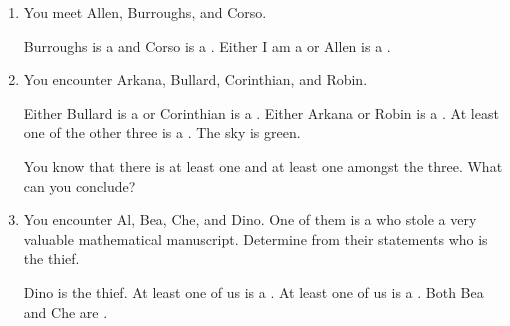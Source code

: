 \probsec{~\ref{sec:conjunctions}}
\begin{enumerate}
    \item You meet Allen, Burroughs, and Corso.
  \begin{dialogue}
     Burroughs is a \knave and Corso is a \knight.
     Either I am a \knave or Allen is a \knave.
  \end{dialogue}


  \item You encounter Arkana, Bullard, Corinthian, and Robin.
  \begin{dialogue}
     Either Bullard is a \knight or Corinthian is a \knave.
     Either Arkana or Robin is a \knave.
     At least one of the other three is a \knave.
     The sky is green.
  \end{dialogue}
  You know that there is at least one \knight and at least one \knave amongst the three. What can you conclude?

  \item You encounter Al, Bea, Che, and Dino. One of them is a \knave who stole a very valuable mathematical manuscript. Determine from their statements who is the thief.
  \begin{dialogue}
     Dino is the thief.
     At least one of us is a \knight.
     At least one of us is a \knave.
     Both Bea and Che are \knights.
  \end{dialogue}

\end{enumerate}
